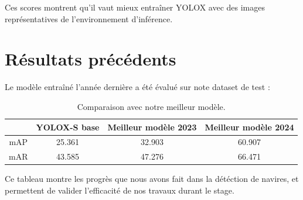 Ces scores montrent qu'il vaut mieux entraîner YOLOX avec des images représentatives de
l'environnement d'inférence.

\section{Résultats précédents}

Le modèle entraîné l'année dernière a été évalué sur note dataset de test : \\

\begin{table}[h]
    \begin{center}
        \begin{tabular}{c c c c}
            \hline
            & YOLOX-S base & Meilleur modèle 2023 & \textbf{Meilleur modèle 2024} \\
            \hline
            mAP & 25.361 & 32.903 & 60.907 \\
            mAR & 43.585 & 47.276 & 66.471 \\
        \end{tabular}
    \end{center}
    \caption{Comparaison avec notre meilleur modèle.}
\end{table}

Ce tableau montre les progrès que nous avons fait dans la détéction de navires,
et permettent de valider l'efficacité de nos travaux durant le stage.
